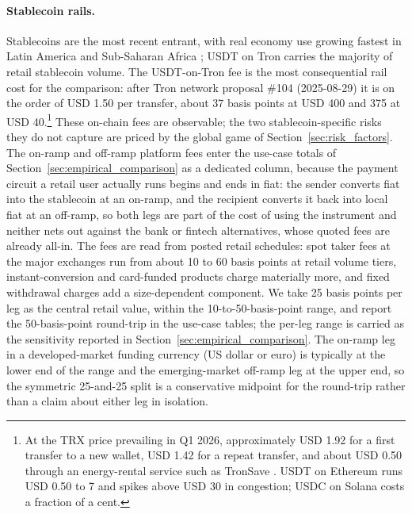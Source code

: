 \paragraph{Stablecoin rails.} Stablecoins are the most recent entrant, with real economy use growing fastest in Latin America and Sub-Saharan Africa \citep{chainalysis_2025}; USDT on Tron carries the majority of retail stablecoin volume. The USDT-on-Tron fee is the most consequential rail cost for the comparison: after Tron network proposal \#104 (2025-08-29) it is on the order of USD 1.50 per transfer, about 37 basis points at USD 400 and 375 at USD 40.\footnote{At the TRX price prevailing in Q1 2026, approximately USD 1.92 for a first transfer to a new wallet, USD 1.42 for a repeat transfer, and about USD 0.50 through an energy-rental service such as TronSave \citep{tronsave_blog_2026}. USDT on Ethereum runs USD 0.50 to 7 and spikes above USD 30 in congestion; USDC on Solana costs a fraction of a cent.} These on-chain fees are observable; the two stablecoin-specific risks they do not capture are priced by the global game of Section~\ref{sec:risk_factors}. The on-ramp and off-ramp platform fees enter the use-case totals of Section~\ref{sec:empirical_comparison} as a dedicated column, because the payment circuit a retail user actually runs begins and ends in fiat: the sender converts fiat into the stablecoin at an on-ramp, and the recipient converts it back into local fiat at an off-ramp, so both legs are part of the cost of using the instrument and neither nets out against the bank or fintech alternatives, whose quoted fees are already all-in. The fees are read from posted retail schedules: spot taker fees at the major exchanges run from about 10 to 60 basis points at retail volume tiers, instant-conversion and card-funded products charge materially more, and fixed withdrawal charges add a size-dependent component. We take 25 basis points per leg as the central retail value, within the 10-to-50-basis-point range, and report the 50-basis-point round-trip in the use-case tables; the per-leg range is carried as the sensitivity reported in Section~\ref{sec:empirical_comparison}. The on-ramp leg in a developed-market funding currency (US dollar or euro) is typically at the lower end of the range and the emerging-market off-ramp leg at the upper end, so the symmetric 25-and-25 split is a conservative midpoint for the round-trip rather than a claim about either leg in isolation.
